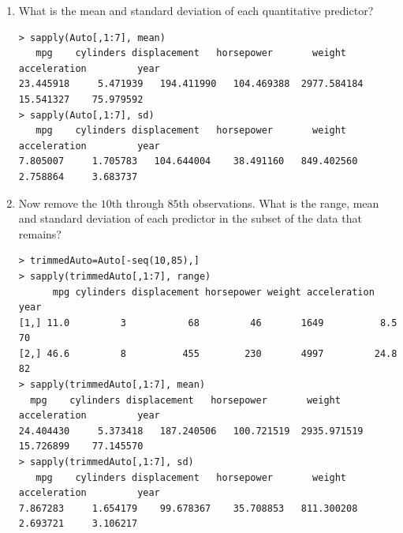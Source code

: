 \documentclass[11pt]{article}
\begin{document}
\begin{enumerate}
\begin{enumerate}
\item What is the mean and standard deviation of each quantitative predictor?
\begin{lstlisting}
> sapply(Auto[,1:7], mean)
   mpg    cylinders displacement   horsepower       weight acceleration         year 
23.445918     5.471939   194.411990   104.469388  2977.584184    15.541327    75.979592 
> sapply(Auto[,1:7], sd)
   mpg    cylinders displacement   horsepower       weight acceleration         year 
7.805007     1.705783   104.644004    38.491160   849.402560     2.758864     3.683737 
\end{lstlisting}

\item Now remove the $10$th through $85$th observations.  What is the range, mean and standard deviation of each predictor in the subset of the data that remains?
\begin{lstlisting}
> trimmedAuto=Auto[-seq(10,85),]
> sapply(trimmedAuto[,1:7], range)
      mpg cylinders displacement horsepower weight acceleration year
[1,] 11.0         3           68         46       1649          8.5   70
[2,] 46.6         8          455        230       4997         24.8   82
> sapply(trimmedAuto[,1:7], mean)
  mpg    cylinders displacement   horsepower       weight acceleration         year 
24.404430     5.373418   187.240506   100.721519  2935.971519    15.726899    77.145570 
> sapply(trimmedAuto[,1:7], sd)
   mpg    cylinders displacement   horsepower       weight acceleration         year 
7.867283     1.654179    99.678367    35.708853   811.300208     2.693721     3.106217
\end{lstlisting}


\end{enumerate}
\end{enumerate}
\end{document}
